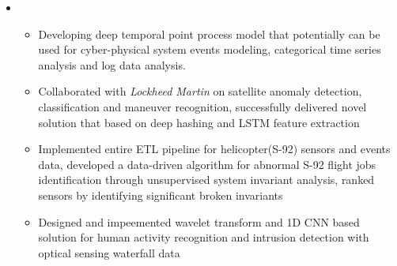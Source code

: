 \documentclass[11pt,a4paper,sans]{moderncv}        %
\begin{document}
\vspace{4pt}

\begin{itemize}

	\item{
		{\vspace{3pt}
			\begin{itemize}
				\item Developing deep temporal point process model that potentially can be used for cyber-physical system events modeling, categorical time series analysis and log data analysis.
				\item Collaborated with \emph{Lockheed Martin} on satellite anomaly detection, classification and maneuver recognition, successfully delivered novel solution that based on deep hashing and LSTM feature extraction  
				\item Implemented entire ETL pipeline for helicopter(S-92) sensors and events data, developed a data-driven algorithm for abnormal S-92 flight jobs identification through unsupervised system invariant analysis, ranked sensors by identifying significant broken invariants 
				\item Designed and impeemented wavelet transform and 1D CNN based solution for human activity recognition and intrusion detection with optical sensing waterfall data 
			\end{itemize}}}


\end{itemize}
\end{document}
